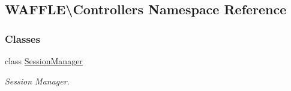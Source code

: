 \hypertarget{namespace_w_a_f_f_l_e_1_1_controllers}{}\subsection{W\+A\+F\+F\+LE\textbackslash{}Controllers Namespace Reference}
\label{namespace_w_a_f_f_l_e_1_1_controllers}
\subsubsection*{Classes}
\begin{DoxyCompactItemize}
\item 
class \hyperlink{class_w_a_f_f_l_e_1_1_controllers_1_1_session_manager}{Session\+Manager}
\begin{DoxyCompactList}\small\item\em Session Manager. \end{DoxyCompactList}\end{DoxyCompactItemize}
